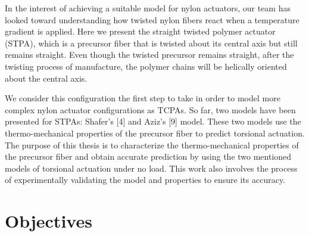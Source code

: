 \documentclass[12pt,oneside]{article}
\begin{document}
	In the interest of achieving a suitable model for nylon actuators, our team has looked toward understanding how twisted nylon fibers react when a temperature gradient is applied. Here we present the straight twisted polymer actuator (STPA), which is a precursor fiber that is twisted about
its central axis but still remains straight. Even though the twisted precursor remains straight, after the twisting process of manufacture, the polymer chains will be helically oriented about the central axis.\par 

	We consider this configuration the first step to take in order to
model more complex nylon actuator configurations as TCPAs. So far, two models have been presented for STPAs: Shafer's [4] and Aziz's [9] model. These two models use the thermo-mechanical properties of the precursor fiber to predict torsional actuation. The purpose of this thesis is to characterize the thermo-mechanical properties of the precursor fiber and obtain accurate prediction by using the two mentioned models of torsional actuation under no load. This work also involves the process of experimentally validating the model and properties to ensure its accuracy.

	


	
	  

\section*{Objectives}

\end{document}
